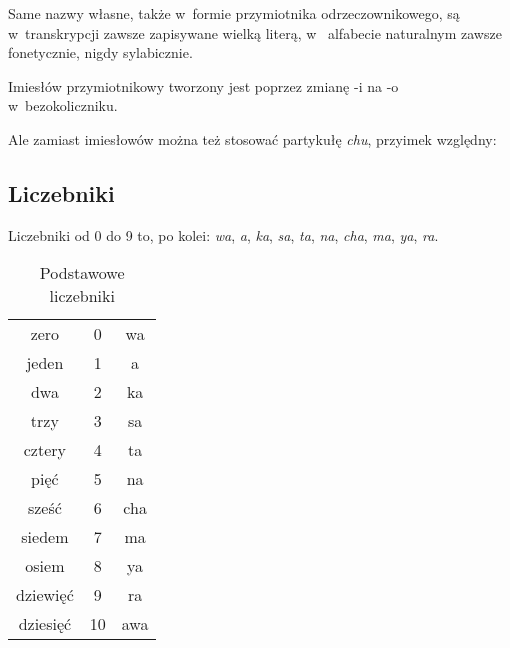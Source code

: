 \begin{spacing}{1.1}
Same nazwy własne, także w~formie przymiotnika odrzeczownikowego, są
w~transkrypcji zawsze zapisywane wielką literą, w~ alfabecie naturalnym zawsze
fonetycznie, nigdy sylabicznie.

Imiesłów przymiotnikowy tworzony jest poprzez zmianę -i na -o w~bezokoliczniku.


Ale zamiast imiesłowów można też stosować partykułę \emph{chu}, przyimek
względny:






\subsection{Liczebniki}

Liczebniki od 0 do 9 to, po kolei: \emph{wa}, \emph{a}, \emph{ka}, \emph{sa}, 
\emph{ta}, \emph{na}, \emph{cha}, \emph{ma}, \emph{ya}, \emph{ra}.

\begin{table}[ht]
	\centering
	\caption{Podstawowe liczebniki}
	\begin{tabular}{ccc} \toprule
		zero & 0 & wa \\
		jeden & 1 & a \\
		dwa & 2 & ka \\
		trzy & 3 & sa \\
		cztery & 4 & ta \\
		pięć & 5 & na \\
		sześć & 6 & cha \\
		siedem & 7 & ma \\
		osiem & 8 & ya \\
		dziewięć & 9 & ra \\
		dziesięć & 10 & awa \\\bottomrule
	\end{tabular}
	\label{tab:numerals}
\end{table}


\end{spacing}
